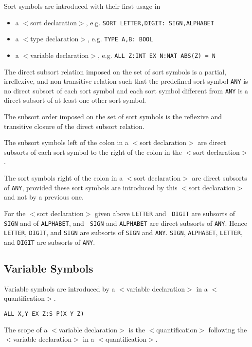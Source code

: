 Sort symbols are introduced with their first usage in 
\begin{itemize}
\item a $<$sort declaration$>$, e.g. {\tt SORT LETTER,DIGIT: SIGN,ALPHABET}
\item a $<$type declaration$>$, e.g. {\tt TYPE A,B: BOOL } 
\item a $<$variable declaration$>$, e.g. {\tt ALL Z:INT EX N:NAT ABS(Z) = N}
\end{itemize}

The direct subsort relation imposed on the set of sort symbols is a partial, 
irreflexive, and non-transitive relation such that the predefined sort 
symbol {\tt ANY} is no direct subsort of each sort symbol and each sort symbol 
different from {\tt ANY} is a direct subsort of at least one other sort symbol. 

The subsort order imposed on the set of sort symbols is the reflexive and 
transitive closure of the direct subsort relation. 

The subsort symbols left of the colon in a $<$sort declaration$>$ are direct 
subsorts of each sort symbol to the right of the colon in the $<$sort 
declaration$>$. 

The sort symbols right of the colon in a $<$sort declaration$>$ are
direct subsorts of {\tt ANY}, provided these sort symbols are
introduced by this $<$sort declaration$>$ and not by a previous one.

\Ex

For the $<$sort declaration$>$ given above {\tt LETTER} and {\tt
DIGIT} are subsorts of {\tt SIGN} and of {\tt ALPHABET}, and {\tt
SIGN} and {\tt ALPHABET} are direct subsorts of {\tt ANY}.  Hence {\tt
LETTER}, {\tt DIGIT}, and {\tt SIGN} are subsorts of {\tt SIGN} and
{\tt ANY}. {\tt SIGN}, {\tt ALPHABET}, {\tt LETTER}, and {\tt DIGIT}
are subsorts of {\tt ANY}.

\subsection{Variable Symbols}
\label{VariableSymbols} 

Variable symbols are introduced by a $<$variable declaration$>$ in a 
$<$quantification$>$. 

\Ex

{\tt ALL X,Y EX Z:S P(X Y Z)}

The scope of a $<$variable declaration$>$ is the  $<$quantification$>$ following the 
$<$variable declaration$>$ in a $<$quantification$>$.

